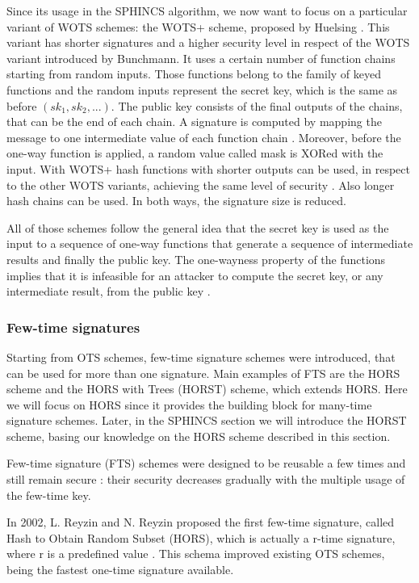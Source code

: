 \documentclass[a4paper,12pt]{article}
\begin{document}
Since its usage in the SPHINCS algorithm, we now want to focus on a particular variant of WOTS schemes: the WOTS+ scheme, proposed by Huelsing \cite{48_WOTS+}. This variant has shorter signatures and a higher security level in respect of the WOTS variant introduced by Bunchmann.
It uses a certain number of function chains starting from random inputs. Those functions belong to the family of keyed functions and the random inputs represent the secret key, which is the same as before $(sk_{1}, sk_{2}, ...)$.
The public key consists of the final outputs of the chains, that can be the end of each chain. A signature is computed by mapping the message to one intermediate value of each function chain \cite{48_WOTS+}. Moreover, before the one-way function is applied, a random value called mask is XORed with the input.
With WOTS+ hash functions with shorter outputs can be used, in respect to the other WOTS variants, achieving the same level of security \cite{53_hbs}. Also longer hash chains can be used. In both ways, the signature size is reduced. 

All of those schemes follow the general idea that the secret key is used as the input to a sequence of one-way functions that generate a sequence of intermediate results and finally the public key. The one-wayness property of the functions implies that it is infeasible for an attacker to compute the secret key, or any intermediate result, from the public key \cite{47_MultipleTimes}.

\subsubsection{Few-time signatures}
\label{subsub:fts}

Starting from OTS schemes, few-time signature schemes were introduced, that can be used for more than one signature. Main examples of FTS are the HORS scheme and the HORS with Trees (HORST) scheme, which extends HORS. Here we will focus on HORS since it provides the building block for many-time signature schemes. Later, in the SPHINCS section we will introduce the HORST scheme, basing our knowledge on the HORS scheme described in this section.

Few-time signature (FTS) schemes were designed to be reusable a few times and still remain secure \cite{7_hashbased}: their security decreases gradually with the multiple usage of the few-time key.

In 2002, L. Reyzin and N. Reyzin proposed the first few-time signature, called Hash to Obtain Random Subset (HORS), which is actually a r-time signature, where r is a predefined value \cite{49_HORS}. This schema improved existing OTS schemes, being the fastest one-time signature available.
\end{document}
